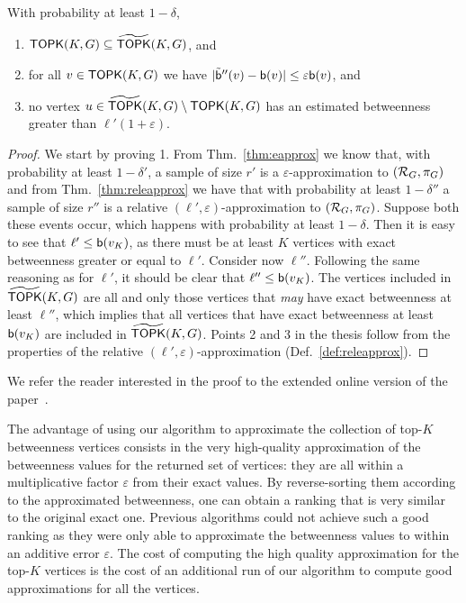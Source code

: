 \begin{lemma}
  With probability at least $1-\delta$, 
  \begin{enumerate}
    \item $\mathsf{TOPK}(K,G)\subseteq \widetilde{\mathsf{TOPK}}(K,G)$, and
    \item for all $v\in\mathsf{TOPK}(K,G)$ we have
      $|\tilde{\mathsf{b}}''(v)-\mathsf{b}(v)|\le\varepsilon\mathsf{b}(v)$, and
    \item no vertex $u\in\widetilde{\mathsf{TOPK}}(K,G)\setminus\mathsf{TOPK}(K,G)$ has an estimated
      betweenness greater than $\ell'(1+\varepsilon)$.
  \end{enumerate}
\end{lemma}
\ifproof
\begin{proof}
  We start by proving 1. From Thm.~\ref{thm:eapprox} we know that, with probability at least
  $1-\delta'$, a sample of size $r'$ is a $\varepsilon$-approximation to
  $(\mathcal{R}_G,\pi_G)$ and from Thm.~\ref{thm:releapprox} we have that with
  probability at least $1-\delta''$ a sample of size $r''$ is a relative
  $(\ell',\varepsilon)$-approximation to $(\mathcal{R}_G,\pi_G)$. Suppose both these
  events occur, which happens with probability at least $1-\delta$. Then it is
  easy to see that $\ell'\le\mathsf{b}(v_K)$, as there must be at least $K$ vertices
  with exact betweenness greater or equal to $\ell'$.  Consider now $\ell''$.
  Following the same reasoning as for $\ell'$, it should be clear that
  $\ell''\le\mathsf{b}(v_K)$. The vertices included in $\widetilde{\mathsf{TOPK}}(K,G)$ are all and
  only those vertices that \emph{may} have exact betweenness at least $\ell''$,
  which implies that all vertices that have exact betweenness at least
  $\mathsf{b}(v_K)$ are included in $\widetilde{\mathsf{TOPK}}(K,G)$. 
  Points 2 and 3 in the thesis follow from the properties of the relative
  $(\ell',\varepsilon)$-approximation (Def.~\ref{def:releapprox}).
\end{proof}
\else
We refer the reader interested in the proof to the extended online version of
the paper~\citep{RiondatoK13}.
\fi

The advantage of using our algorithm to approximate the collection of top-$K$
betweenness vertices consists in the very high-quality approximation of the
betweenness values for the returned set of vertices: they are all within a
multiplicative factor $\varepsilon$ from their exact values. By reverse-sorting
them according to the approximated betweenness, one can obtain a ranking that is
very similar to the original exact one. Previous algorithms could not achieve such a
good ranking as they were only able to approximate the betweenness values to
within an additive error $\varepsilon$. The cost of computing the high quality
approximation for the top-$K$ vertices is the cost of an additional run of our
algorithm to compute good approximations for all the vertices.

